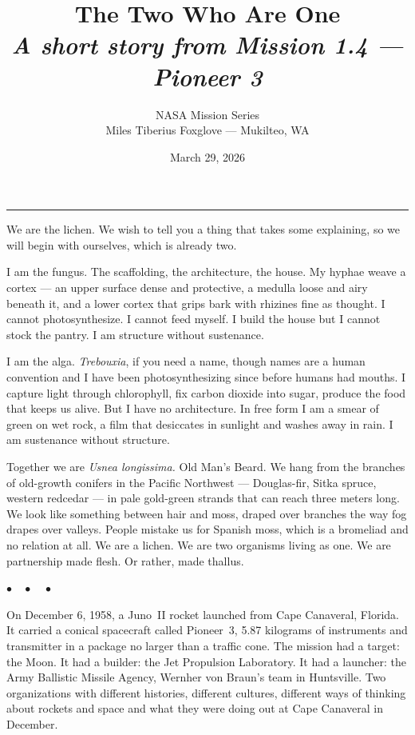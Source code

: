\documentclass[12pt, letterpaper]{article}
\title{\Huge\textbf{The Two Who Are One}\\[0.5em]\large\textit{A short story from Mission 1.4 --- Pioneer 3}}
\author{NASA Mission Series\\[0.3em]\small Miles Tiberius Foxglove --- Mukilteo, WA}
\date{March 29, 2026}
\begin{document}
\maketitle
\thispagestyle{empty}

\vspace{1em}
\noindent\rule{\textwidth}{0.4pt}
\vspace{1em}

\noindent We are the lichen. We wish to tell you a thing that takes some explaining, so we will begin with ourselves, which is already two.

I am the fungus. The scaffolding, the architecture, the house. My hyphae weave a cortex --- an upper surface dense and protective, a medulla loose and airy beneath it, and a lower cortex that grips bark with rhizines fine as thought. I cannot photosynthesize. I cannot feed myself. I build the house but I cannot stock the pantry. I am structure without sustenance.

I am the alga. \textit{Trebouxia}, if you need a name, though names are a human convention and I have been photosynthesizing since before humans had mouths. I capture light through chlorophyll, fix carbon dioxide into sugar, produce the food that keeps us alive. But I have no architecture. In free form I am a smear of green on wet rock, a film that desiccates in sunlight and washes away in rain. I am sustenance without structure.

Together we are \textit{Usnea longissima.} Old Man's Beard. We hang from the branches of old-growth conifers in the Pacific Northwest --- Douglas-fir, Sitka spruce, western redcedar --- in pale gold-green strands that can reach three meters long. We look like something between hair and moss, draped over branches the way fog drapes over valleys. People mistake us for Spanish moss, which is a bromeliad and no relation at all. We are a lichen. We are two organisms living as one. We are partnership made flesh. Or rather, made thallus.

\begin{center}
$\bullet\quad\bullet\quad\bullet$
\end{center}

On December 6, 1958, a Juno~II rocket launched from Cape Canaveral, Florida. It carried a conical spacecraft called Pioneer~3, 5.87 kilograms of instruments and transmitter in a package no larger than a traffic cone. The mission had a target: the Moon. It had a builder: the Jet Propulsion Laboratory. It had a launcher: the Army Ballistic Missile Agency, Wernher von Braun's team in Huntsville. Two organizations with different histories, different cultures, different ways of thinking about rockets and space and what they were doing out at Cape Canaveral in December.
\end{document}
